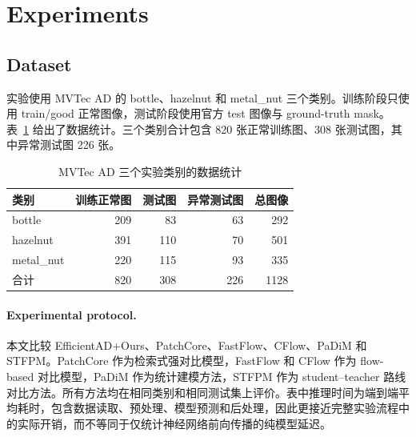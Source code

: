 \documentclass[letterpaper]{article}
\newcommand{\method}{EfficientAD+Ours}
\begin{document}
\section{Experiments}

\subsection{Dataset}

实验使用 MVTec AD 的 bottle、hazelnut 和 metal\_nut 三个类别。训练阶段只使用 train/good 正常图像，测试阶段使用官方 test 图像与 ground-truth mask。表~\ref{tab:data} 给出了数据统计。三个类别合计包含 820 张正常训练图、308 张测试图，其中异常测试图 226 张。

\begin{table}[t]
\centering
\caption{MVTec AD 三个实验类别的数据统计}
\footnotesize
\setlength{\tabcolsep}{5pt}
\begin{tabular}{lrrrr}
\toprule
类别 & 训练正常图 & 测试图 & 异常测试图 & 总图像 \\
\midrule
bottle & 209 & 83 & 63 & 292 \\
hazelnut & 391 & 110 & 70 & 501 \\
metal\_nut & 220 & 115 & 93 & 335 \\
\midrule
合计 & 820 & 308 & 226 & 1128 \\
\bottomrule
\end{tabular}
\label{tab:data}
\end{table}

\paragraph{Experimental protocol.}

本文比较 \method{}、PatchCore、FastFlow、CFlow、PaDiM 和 STFPM。PatchCore 作为检索式强对比模型，FastFlow 和 CFlow 作为 flow-based 对比模型，PaDiM 作为统计建模方法，STFPM 作为 student--teacher 路线对比方法。所有方法均在相同类别和相同测试集上评价。表中推理时间为端到端平均耗时，包含数据读取、预处理、模型预测和后处理，因此更接近完整实验流程中的实际开销，而不等同于仅统计神经网络前向传播的纯模型延迟。
\end{document}
